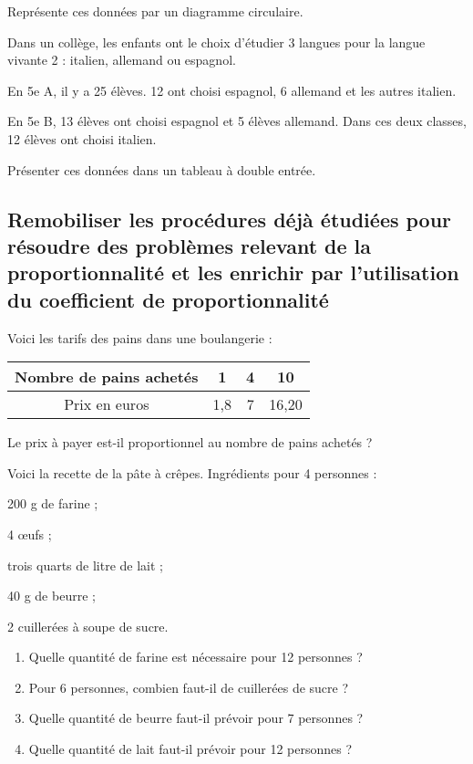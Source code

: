 Représente ces données par un diagramme circulaire.




Dans un collège, les enfants ont le choix d'étudier 3 langues pour la langue vivante 2 : italien,  allemand ou espagnol.
\begin{description}
\item En 5e A, il y a 25 élèves. 12 ont choisi espagnol, 6 allemand et les autres italien.
\item En 5e B, 13 élèves ont choisi espagnol et 5 élèves allemand.
Dans ces deux classes, 12 élèves ont choisi italien.
\end{description} 
Présenter ces données dans un tableau à double entrée.




\subsection{Remobiliser les procédures déjà étudiées pour résoudre des problèmes relevant de la proportionnalité et les enrichir par l'utilisation du coefficient de proportionnalité}


Voici les tarifs des pains dans une boulangerie :

\begin{tabular}{|c|c|c|c|}
\hline 
Nombre de pains achetés & 1 & 4 & 10 \\ 
\hline 
Prix en euros & 1,8 & 7 & 16,20 \\ 
\hline 
\end{tabular} 

Le prix à payer est-il proportionnel au nombre de pains achetés ?




Voici la recette de la pâte à crêpes. Ingrédients pour 4 personnes :
\begin{description}
\item 200 g de farine ;
\item 4 œufs ;
\item trois quarts de litre de lait ;
\item 40 g de beurre ;
\item 2 cuillerées à soupe de sucre.
\end{description}

\begin{enumerate}
\item Quelle quantité de farine est nécessaire pour 12 personnes ?
\item Pour 6 personnes, combien faut-il de cuillerées de sucre ?
\item Quelle quantité de beurre faut-il prévoir pour 7 personnes ?
\item Quelle quantité de lait faut-il prévoir pour 12 personnes ? 
\end{enumerate}


